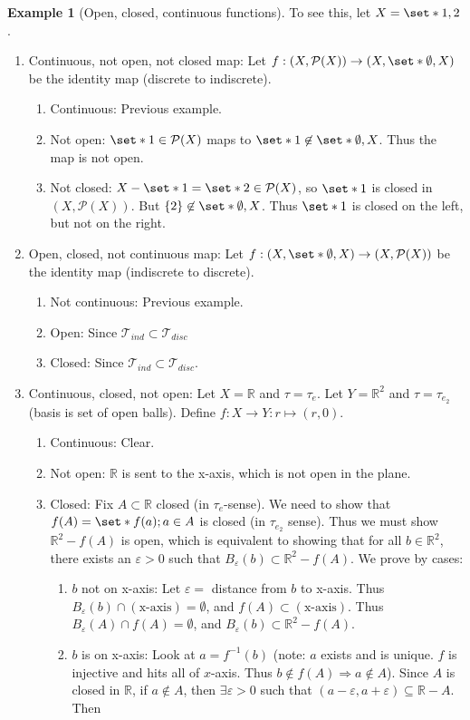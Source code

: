 \documentclass[11pt]{article}
\numberwithin{equation}{section}
\newcounter{theo}[section]\setcounter{theo}{0}
\theoremstyle{definition}
\theoremstyle{definition}
\newtheorem{example}{\color{WildStrawberry}Example}[section]
\def\Set{\set*}%
\def\ss{\subset}
\def\sse{\subseteq}
\def\imp{\Rightarrow}
\newcommand{\1}{\mathbbm 1}
\def\t{\tau}
\newcommand{\e}{\varepsilon}
\newcommand{\RR}{\mathbb R}
\newcommand{\pP}{\mathcal P}
\newcommand{\tT}{\mathcal T}
\begin{document}
\begin{example}[Open, closed, continuous functions]
	To see this, let $X = \Set{1,2}$.
	\begin{enumerate}
		\item Continuous, not open, not closed map: Let $f : (X,\pP(X)) \to (X,\Set{\emptyset,X})$ be the identity map (discrete to indiscrete). 
		\begin{enumerate}
			\item Continuous: Previous example.
			\item Not open: $\Set{1} \in \pP(X)$ maps to $\Set{1} \not\in \Set{\emptyset,X}$. Thus the map is not open.
			\item Not closed: $X - \Set{1} = \Set{2} \in \pP(X)$, so $\Set{1}$ is closed in $(X,\pP(X))$. But $\{2\} \not\in \Set{\emptyset,X}$. Thus $\Set{1}$ is closed on the left, but not on the right.
		\end{enumerate} 
		\item Open, closed, not continuous map: Let $f : (X,\Set{\emptyset,X}) \to (X,\pP(X))$ be the identity map (indiscrete to discrete).
		\begin{enumerate}
		 	\item Not continuous: Previous example. 
		 	\item Open: Since $\tT_{ind} \ss \tT_{disc}$ 
		 	\item Closed: Since $\tT_{ind} \ss \tT_{disc}$.
		 \end{enumerate} 
		 \item Continuous, closed, not open: Let $X = \RR$ and $\t = \t_e$. Let $Y = \RR^2$ and $\t = \t_{e_2}$ (basis is set of open balls). Define $f: X\to Y: r \mapsto (r,0)$. 
		 \begin{enumerate}
		 	\item Continuous: Clear. 
		 	\item Not open: $\RR$ is sent to the x-axis, which is not open in the plane. 
		 	\item Closed: Fix $A \ss \RR$ closed (in $\t_e$-sense). We need to show that $f(A) = \Set{f(a); a \in A}$ is closed (in $\t_{e_2}$ sense). Thus we must show $\RR^2 - f(A)$ is open, which is equivalent to showing that for all $b \in \RR^2$, there exists an $\e > 0$ such that $B_\e(b) \ss \RR^2 - f(A)$. We prove by cases:
		 	\begin{enumerate}
		 	 	\item $b$ not on x-axis: Let $\e = $ distance from $b$ to x-axis. Thus $B_\e(b) \cap (\text{x-axis}) = \emptyset$, and $f(A) \ss (\text{x-axis})$. Thus $B_\e(A) \cap f(A) = \emptyset$, and $B_\e(b) \ss \RR^2 - f(A)$. 
		 	 	\item $b$ is on x-axis: Look at $a = f^{-1}(b)$ (note: $a$ exists and is unique. $f$ is injective and  hits all of $x$-axis. Thus $b \not\in f(A) \imp a \not\in A $). Since $A$ is closed in $\RR$, if $a \not\in A$, then $\exists \e > 0$ such that $(a-\e,a+\e) \sse \RR - A$. Then 

\end{enumerate}
\end{enumerate}
\end{enumerate}
\end{example}
\end{document}
